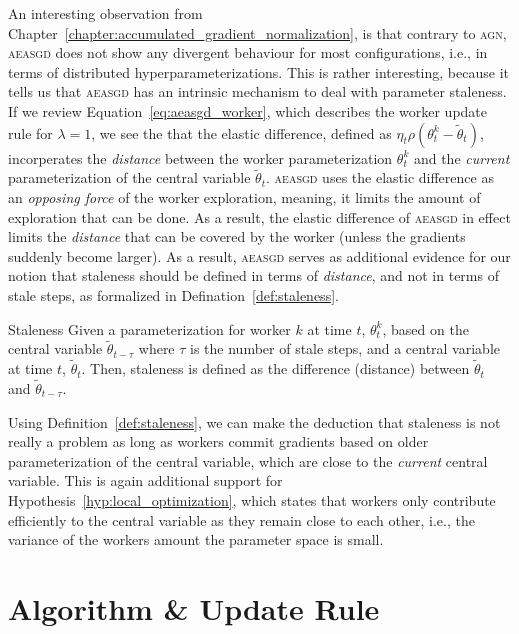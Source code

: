 An interesting observation from Chapter~\ref{chapter:accumulated_gradient_normalization}, is that contrary to \textsc{agn}, \textsc{aeasgd} does not show any divergent behaviour for most configurations, i.e., in terms of distributed hyperparameterizations. This is rather interesting, because it tells us that \textsc{aeasgd} has an intrinsic mechanism to deal with parameter staleness. If we review Equation~\ref{eq:aeasgd_worker}, which describes the worker update rule for $\lambda = 1$, we see the that the elastic difference, defined as $\eta_t\rho(\theta^k_t - \tilde{\theta}_t)$, incorperates the \emph{distance} between the worker parameterization $\theta^k_t$ and the \emph{current} parameterization of the central variable $\tilde{\theta}_t$. \textsc{aeasgd} uses the elastic difference as an \emph{opposing force} of the worker exploration, meaning, it limits the amount of exploration that can be done. As a result, the elastic difference of \textsc{aeasgd} in effect limits the \emph{distance} that can be covered by the worker (unless the gradients suddenly become larger). As a result, \textsc{aeasgd} serves as additional evidence for our notion that staleness should be defined in terms of \emph{distance}, and not in terms of stale steps, as formalized in Defination~\ref{def:staleness}.

\begin{definition}{Staleness}
  \label{def:staleness}
  Given a parameterization for worker $k$ at time $t$, $\theta^k_t$, based on the central variable $\tilde{\theta}_{t - \tau}$ where $\tau$ is the number of stale steps, and a central variable at time $t$, $\tilde{\theta}_t$. Then, staleness is defined as the difference (distance) between $\tilde{\theta}_t$ and $\tilde{\theta}_{t-\tau}$.
\end{definition}

Using Definition~\ref{def:staleness}, we can make the deduction that staleness is not really a problem as long as workers commit gradients based on older parameterization of the central variable, which are close to the \emph{current} central variable. This is again additional support for Hypothesis~\ref{hyp:local_optimization}, which states that workers only contribute efficiently to the central variable as they remain close to each other, i.e., the variance of the workers amount the parameter space is small.

\section{Algorithm \& Update Rule}
\label{sec:adag_algorithm}

